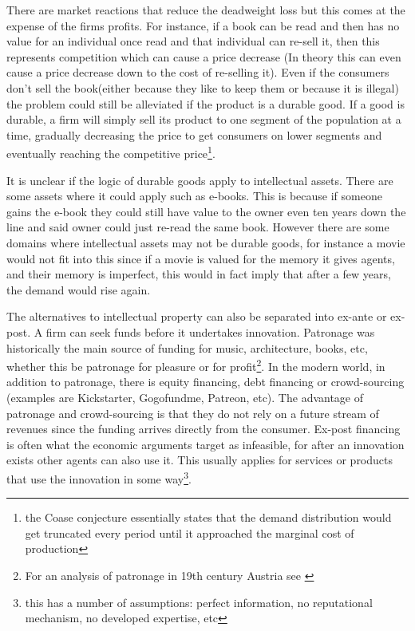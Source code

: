 There are market reactions that reduce the deadweight loss but this comes at the expense of the firms profits. For instance, if a book can be read and then has no value for an individual once read and that individual can re-sell it, then this represents competition which can cause a price decrease (In theory this can even cause a price decrease down to the cost of re-selling it). Even if the consumers don't sell the book(either because they like to keep them or because it is illegal) the problem could still be alleviated if the product is a durable good. If a good is durable, a firm will simply sell its product to one segment of the population at a time, gradually decreasing the price to get consumers on lower segments and eventually reaching the competitive price\footnote{the Coase conjecture essentially states that the demand distribution would get truncated every period until it approached the marginal cost of production}. 

It is unclear if the logic of durable goods apply to intellectual assets. There are some assets where it could apply such as e-books. This is because if someone gains the e-book they could still have value to the owner even ten years down the line and said owner could just re-read the same book. However there are some domains where intellectual assets may not be durable goods, for instance a movie would not fit into this since if a movie is valued for the memory it gives agents, and their memory is imperfect, this would in fact imply that after a few years, the demand would rise again. 


The alternatives to intellectual property can also be separated into ex-ante or ex-post. A firm can seek funds before it undertakes innovation. Patronage was historically the main source of funding for music, architecture, books, etc, whether this be patronage for pleasure or for profit\footnote{For an analysis of patronage in 19th century Austria see \cite{carletti2013top} }. In the modern world, in addition to patronage, there is equity financing, debt financing or crowd-sourcing (examples are Kickstarter, Gogofundme, Patreon, etc). The advantage of patronage and crowd-sourcing is that they do not rely on a future stream of revenues since the funding arrives directly from the consumer. Ex-post financing is often what the economic arguments target as infeasible, for after an innovation exists other agents can also use it. This usually applies for services or products that use the innovation in some way\footnote{ this has a number of assumptions: perfect information, no reputational mechanism, no developed expertise, etc }.

